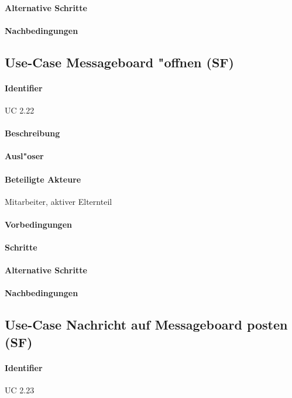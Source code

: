   \paragraph{Alternative Schritte}
  \paragraph{Nachbedingungen}

  
  \newpage
 \subsection{Use-Case Messageboard "offnen (SF)}
  \paragraph{Identifier}
  UC 2.22
  \paragraph{Beschreibung}
  \paragraph{Ausl"oser}
  \paragraph{Beteiligte Akteure}   \leavevmode \newline
    Mitarbeiter, aktiver Elternteil
  \paragraph{Vorbedingungen}
  \paragraph{Schritte}
  \paragraph{Alternative Schritte}
  \paragraph{Nachbedingungen}

  
  \newpage
 \subsection{Use-Case Nachricht auf Messageboard posten (SF)}
  \paragraph{Identifier}
  UC 2.23
